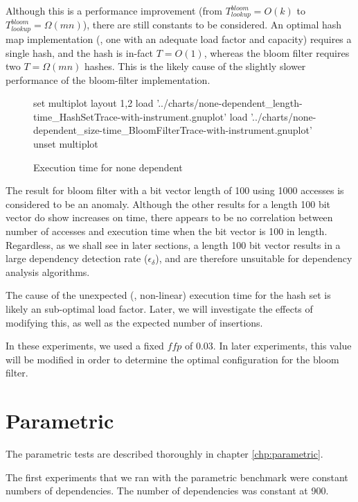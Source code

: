 	Although this is a performance improvement (from $T_{lookup}^{bloom}=O(k)$ to $T_{lookup}^{bloom}=\Omega(mn)$), there are still constants to be considered. An optimal hash map implementation (\ie, one with an adequate load factor and capacity) requires a single hash, and the hash is in-fact $T=O(1)$, whereas the bloom filter requires two $T=\Omega(mn)$ hashes. This is the likely cause of the slightly slower performance of the bloom-filter implementation. 
	
	\begin{figure}
		\centering
		\begin{gnuplot}[terminal=pdf]
		set multiplot layout 1,2
			load '../charts/none-dependent_length-time_HashSetTrace-with-instrument.gnuplot'
			load '../charts/none-dependent_size-time_BloomFilterTrace-with-instrument.gnuplot'
		unset multiplot
		\end{gnuplot}
		\caption{Execution time for none dependent}
		\label{chart:none-dependent-time-comparison}
	\end{figure}
	
	The result for bloom filter with a bit vector length of 100 using 1000 accesses is considered to be an anomaly. Although the other results for a length 100 bit vector do show increases on time, there appears to be no correlation between number of accesses and execution time when the bit vector is 100 in length. Regardless, as we shall see in later sections, a length 100 bit vector results in a large dependency detection rate ($\epsilon_{\delta}$), and are therefore unsuitable for dependency analysis algorithms.
	
	The cause of the unexpected (\ie, non-linear) execution time for the hash set is likely an sub-optimal load factor. Later, we will investigate the effects of modifying this, as well as the expected number of insertions.
	
	In these experiments, we used a fixed $ffp$ of 0.03. In later experiments, this value will be modified in order to determine the optimal configuration for the bloom filter.

\section{Parametric} \label{sec:results/parametric}
The parametric tests are described thoroughly in chapter \ref{chp:parametric}.

The first experiments that we ran with the parametric benchmark were constant numbers of dependencies. The number of dependencies was constant at 900.

